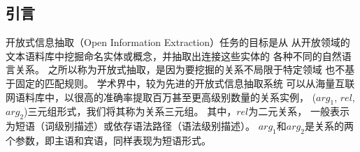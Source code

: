 
\subsection{引言}
\label{sec:tinf-intro}


开放式信息抽取（Open Information Extraction）任务的目标是从
从开放领域的文本语料库中挖掘命名实体或概念，并抽取出连接这些实体的
各种不同的自然语言关系。
之所以称为开放式抽取，是因为要挖掘的关系不局限于特定领域
也不基于固定的匹配规则。
学术界中，较为先进的开放式信息抽取系统
\cite{carlson2010toward,fader2011identifying,schmitz2012open,nakashole2012patty}
可以从海量互联网语料库中，以很高的准确率提取百万甚至更高级别数量的关系实例，
($arg_1$, $rel$, $arg_2$)三元组形式，我们将其称为关系三元组。
其中，$rel$为二元关系，
一般表示为短语（词级别描述）或依存语法路径（语法级别描述）。
$arg_1$和$arg_2$是关系的两个参数，即主语和宾语，同样表现为短语形式。


